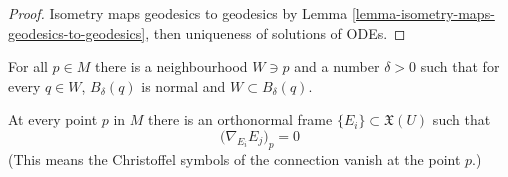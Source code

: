 \begin{proof}
Isometry maps geodesics to geodesics by Lemma 
\ref{lemma-isometry-maps-geodesics-to-geodesics}, then uniqueness of solutions
of ODEs.
\end{proof}

\begin{proposition}
\label{proposition-totally-normal-neighbourhoods}
For all $p \in M$ there is a neighbourhood $W \ni p$ and a number $\delta>0$ 
 such that for every $q \in W$, $B_\delta(q)$ is normal and
 $W \subset B_\delta(q)$. 
\end{proposition}

\begin{lemma}
\label{lemma-geodesic-coordinates}
At every point $p$ in $M$ there is an orthonormal frame 
$\{E_i\} \subset \mathfrak{X}(U)$ such that 
\begin{equation}
\label{equation-normal-coordinates-vanishing-Christoffel-symbols}
\Big(\nabla_{E_i}E_j\Big)_p=0
\end{equation}
(This means the Christoffel symbols of the connection vanish at the point $p$.)
\end{lemma}

